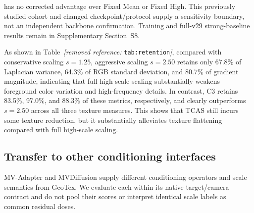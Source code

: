 \documentclass[times,twocolumn,final]{elsarticle}
\providecommand{\DIFadd}[1]{{\protect\color{blue} \sf #1}} %
\providecommand{\DIFdel}[1]{{\protect\color{red} \scriptsize #1}} %
\providecommand{\DIFaddbegin}{} %
\providecommand{\DIFaddend}{} %
\providecommand{\DIFdelbegin}{} %
\providecommand{\DIFdelend}{} %
\begin{document}
\DIFdelend \DIFaddbegin \DIFadd{has no corrected advantage over Fixed Mean or Fixed High. This previously studied cohort and changed checkpoint/protocol supply a sensitivity boundary, not an independent backbone confirmation. Training and full-v29 strong-baseline results remain in Supplementary Section~S8.
}\DIFaddend 

\DIFdelbegin \DIFdel{As shown in Table~\textit{[removed reference: }\texttt{tab:retention}\textit{]}, compared with conservative scaling $s = 1.25$, aggressive scaling $s = 2.50$ retains only 67.8\% of Laplacian variance, 64.3\% of RGB standard deviation, and 80.7\% of gradient magnitude, indicating that full high-scale scaling substantially weakens foreground color variation and high-frequency details. In contrast, C3 retains 83.5\%, 97.0\%, and 88.3\% of these metrics, respectively, and clearly outperforms $s = 2.50$ across all three texture measures. This shows that TCAS still incurs some texture reduction, but it substantially alleviates texture flattening compared with full high-scale scaling. }\DIFdelend \DIFaddbegin \subsection{Transfer to other conditioning interfaces}
\label{subsec:cross-interface}
\DIFadd{MV-Adapter and MVDiffusion supply different conditioning operators and scale semantics from GeoTex. We evaluate each within its native target/camera contract and do not pool their scores or interpret identical scale labels as common residual doses.
}\DIFaddend 
\end{document}
